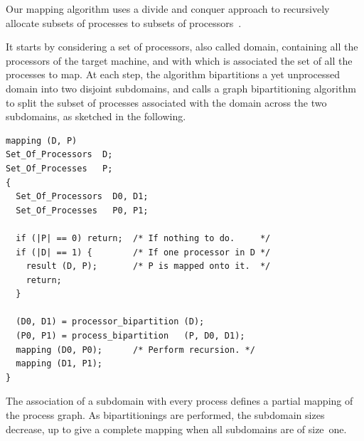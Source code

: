 Our mapping algorithm uses a divide and conquer approach to
recursively allocate subsets of processes to subsets of
processors~\cite{pell94a}.

It starts by considering a set of processors, also called domain,
containing all the processors of the target machine, and with which is
associated the set of all the processes to map.  At each step, the
algorithm bipartitions a yet unprocessed domain into two disjoint
subdomains, and calls a graph bipartitioning algorithm to split the
subset of processes associated with the domain across the two
subdomains, as sketched in the following.

\noi
{\renewcommand{\baselinestretch}{0.95}\footnotesize\tt {%
\begin{verbatim}
mapping (D, P)
Set_Of_Processors  D;
Set_Of_Processes   P;
{
  Set_Of_Processors  D0, D1;
  Set_Of_Processes   P0, P1;

  if (|P| == 0) return;  /* If nothing to do.     */
  if (|D| == 1) {        /* If one processor in D */
    result (D, P);       /* P is mapped onto it.  */
    return;
  }

  (D0, D1) = processor_bipartition (D);
  (P0, P1) = process_bipartition   (P, D0, D1);
  mapping (D0, P0);      /* Perform recursion. */
  mapping (D1, P1);
}
\end{verbatim}}}

\noi
The association of a subdomain with every process defines a partial
mapping of the process graph. As bipartitionings are performed,
the subdomain sizes decrease, up to give a complete mapping when all
subdomains are of size~one.
\\

